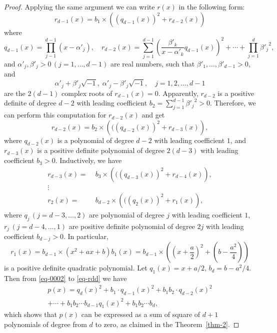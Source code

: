 \documentclass[10pt,a4paper]{amsart}
\begin{document}
\begin{proof}
Applying the same argument we can write 
$r(x)$ in the following form:
\begin{equation}
r_{d-1}(x)=b_1\times \left(\left(q_{d-1}(x)\right)^2+r_{d-2}(x)\right)
\label{eq-rd1}
\end{equation}
where
$$
q_{d-1}(x)= \prod_{j-1}^{d-1}(x-\alpha'_j),\quad 
r_{d-2}(x)=
\sum_{j=1}^{d-1}\left(\frac{\beta'_k}
{x-\alpha'_k}q_{d-1}(x) \right)^2+\cdots+\prod_{j=1}^{d} {\beta'_j}^2,
$$ 
and $\alpha'_j,\beta'_j>0\,(j=1,\ldots,d-1)$ are real numbers, such that $\beta'_1,\ldots,\beta'_{d-1}>0$, and  
$$
\alpha'_j+\beta'_j\sqrt{-1}, \;
\alpha'_j-\beta'_j\sqrt{-1}, \quad j=1,2,\ldots,d-1
$$
are the $2(d-1)$ complex roots of $r_{d-1}(x)=0$. Apparently, $r_{d-2}$ is a positive definite of degree $d-2$ with leading coefficient $b_2=\sum_{j=1}^{d-1}{\beta'_j}^2>0$. Therefore, we can perform this computation for $r_{d-2}(x)$ and get
\begin{equation}
r_{d-2}(x)=b_2\times \left(
(\left(q_{d-2}(x)\right)^2+r_{d-3}(x)
\right),
\label{eq-rd2}
\end{equation}
where $q_{d-2}(x)$ is a polynomial of degree $d-2$ with leading coefficient $1$, and $r_{d-3}(x)$ is a positive definite polynomial of degree $2(d-3)$ with leading coefficient $b_3>0$. 
Inductively, we have
\begin{align}
r_{d-3}(x)=&\;b_3\times \left(
(\left(q_{d-3}(x)\right)^2+r_{d-4}(x)
\right),
\label{eq-rd3}\\
\vdots\;&\nonumber \\
r_{2}(x)=&\;b_{d-2}\times \left(
(\left(q_{2}(x)\right)^2+r_{1}(x)
\right),
\label{eq-rdj}
\end{align}
where $q_{j}\,(j=d-3,\ldots,2)$ are polynomial of degree $j$ with leading coefficient $1$, 
$r_{j}\,(j=d-4,\ldots,1)$ are  positive definite polynomial of degree $2j$ with leading coefficient $b_{d-j}>0$.  In particular,
\begin{equation}
r_1(x)=b_{d-1}\times (x^2+ax+b)
b_1(x)=b_{d-1}\times \left(\left(x+\frac{a}{2}\right)^2+
(b-\frac{a^2}{4})\right)
\label{eq-rdd}
\end{equation}
is a positive definite quadratic polynomial. Let $q_1(x)=x+a/2$, $b_d=b-a^2/4$. Then from \eqref{eq-0002} to \eqref{eq-rdd} we have
\begin{align}
p(x)=q_d(x)^2
+b_1\cdot q_{d-1}(x)^2
+b_1b_2\cdot q_{d-2}(x)^2\nonumber \\
+\cdots+b_1b_2\cdots b_{d-1}q_1(x)^2+
b_1b_2\cdots b_d,
\end{align}
which shows that $p(x)$ can be expressed as a sum of square of $d+1$ polynomials of degree from $d$ to zero, as claimed in the Theorem~\ref{thm-2}.  


\end{proof}
\end{document}
